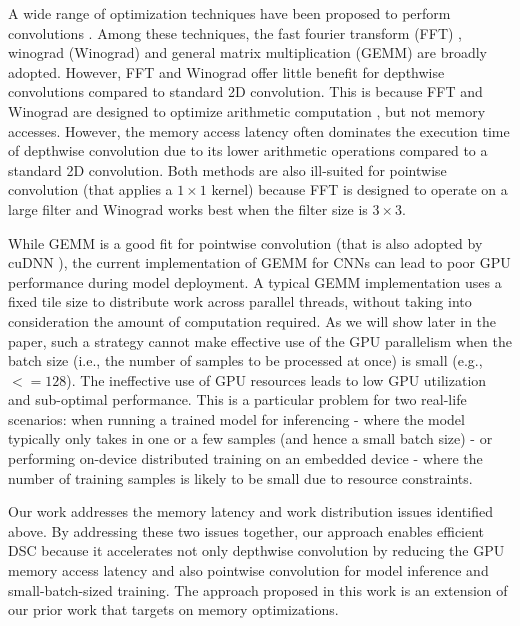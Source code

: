 A wide range of optimization techniques have been proposed to perform convolutions
\cite{Zhen2018Optimizing,liu2019optimizing,winter2019adaptive,li2019autofft,yan2020optimizing,Vasudevan2017Parallel,li2019coordinated,wu2020ugemm}.
Among these techniques, the fast fourier transform (FFT) \cite{li2019autofft}, winograd (Winograd) \cite{yan2020optimizing} and general
matrix multiplication (GEMM) \cite{Vasudevan2017Parallel,li2019coordinated,wu2020ugemm} are broadly adopted. However, FFT and Winograd offer little
benefit for depthwise convolutions compared to standard 2D convolution. This is because FFT and Winograd are designed to optimize
arithmetic computation \cite{zlateski2019anatomy,yan2020optimizing}, but not memory accesses. However, the memory access latency often dominates the execution time of
depthwise convolution \cite{cudaperformance} due to its lower arithmetic operations compared to a standard 2D convolution.  Both methods
are also ill-suited for pointwise convolution (that applies a $1 \times 1$ kernel) because FFT is designed to operate on a large filter and
Winograd works best when the filter size is $3 \times 3$.

While GEMM is a good fit for pointwise convolution (that is also adopted by cuDNN \cite{ChetlurWVCTCS14}), the current implementation of
GEMM for CNNs can lead to poor GPU performance during model deployment. A typical GEMM implementation uses a fixed tile size to distribute
work across parallel threads, without taking into consideration the amount of computation required. As we will show later in the paper,
such a strategy cannot make effective use of the GPU parallelism when the batch size (i.e., the number of samples to be processed at once)
is small (e.g., $<= 128$). The ineffective use of GPU resources leads to low GPU utilization and sub-optimal performance. This is a
particular problem for two real-life scenarios: when running a trained model for inferencing - where the model typically only takes in one
or a few samples (and hence a small batch size) - or performing on-device distributed training on an embedded device - where the number of
training samples is likely to be small due to resource constraints.

Our work addresses the memory latency and work distribution issues identified above. By addressing these two issues together, our approach
enables efficient DSC because it accelerates not only depthwise convolution by reducing the GPU memory access latency and also pointwise
convolution for model inference and small-batch-sized training. {\color{red}The approach proposed in this work is an extension of our prior work \cite{lu2020optimizing} that targets on memory optimizations.}


